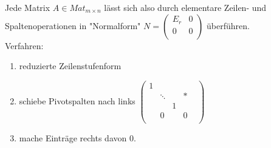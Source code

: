 \documentclass[a4paper,twoside]{article}
\begin{document}
Jede Matrix $A \in Mat_{m\times n}$ lässt sich also durch elementare Zeilen- und Spaltenoperationen in "Normalform" $N = 
\left(\begin{matrix}
E_r & 0\\
0 & 0 \\
\end{matrix} \right)$
überführen.\\
Verfahren: 
\begin{enumerate}
\item reduzierte Zeilenstufenform
\item schiebe Pivotspalten nach links 
$
\left(\begin{matrix}
1\\
& \ddots & & * &\\
& & 1 \\
& 0 & & 0 \\
\end{matrix} \right)
$
\item mache Einträge rechts davon 0.
\end{enumerate}
\end{document}

